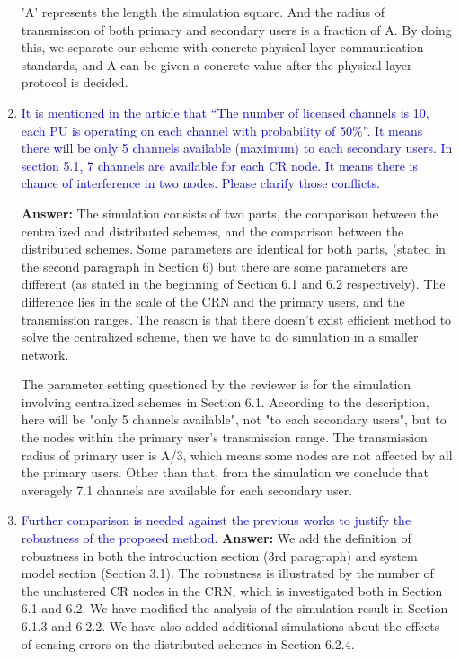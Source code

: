 \documentclass[10pt,a4paper]{article}
\begin{document}
\begin{enumerate}
 'A' represents the length the simulation square.
    And the radius of transmission of both primary and secondary users is a fraction of A.
    By doing this, we separate our scheme with concrete physical layer communication standards, and A can be given a concrete value after the physical layer protocol is decided.
    
\item \textcolor{blue}{ It is mentioned in the article that “The number of licensed channels is 10, each PU is operating on each channel with probability of 50\%”. It means there will be only 5 channels available (maximum) to each secondary users. In section 5.1, 7 channels are available for each CR node. It means there is chance of interference in two nodes. Please clarify those conflicts.}

\textbf{Answer:} 
The simulation consists of two parts, the comparison between the centralized and distributed schemes, and the comparison between the distributed schemes.
Some parameters are identical for both parts, (stated in the second paragraph in Section 6) but there are some parameters are different (as stated in the beginning of Section 6.1 and 6.2 respectively).
The difference lies in the scale of the CRN and the primary users, and the transmission ranges.
The reason is that there doesn't exist efficient method to solve the centralized scheme, then we have to do simulation in a smaller network.

The parameter setting questioned by the reviewer is for the simulation involving centralized schemes in Section 6.1.
According to the description, here will be "only 5 channels available", not "to each secondary users", but to the nodes within the primary user's transmission range.
    The transmission radius of primary user is A/3, which means some nodes are not affected by all the primary users.
    Other than that, from the simulation we conclude that averagely 7.1 channels are available for each secondary user.
    
\item \textcolor{blue}{ Further comparison is needed against the previous works to justify the robustness of the proposed method.}
\textbf{Answer:} 	We add the definition of robustness in both the introduction section (3rd paragraph) and system model section (Section 3.1).
The robustness is illustrated by the number of the unclustered CR nodes in the CRN, which is investigated both in Section 6.1 and 6.2.
We have modified the analysis of the simulation result in Section 6.1.3 and 6.2.2.
We have also added additional simulations about the effects of sensing errors on the distributed schemes in Section 6.2.4.

\end{enumerate}
\end{document}
